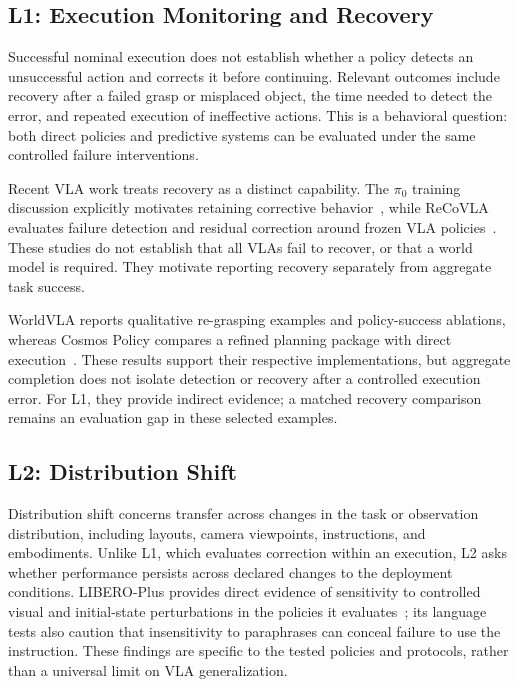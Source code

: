 \documentclass{ieeeaccess}
\begin{document}
\subsection{L1: Execution Monitoring and Recovery}
\label{sec:l1}
\textcolor[RGB]{104,48,148}{Successful nominal execution does not establish whether a policy detects an unsuccessful action and corrects it before continuing. Relevant outcomes include recovery after a failed grasp or misplaced object, the time needed to detect the error, and repeated execution of ineffective actions. This is a behavioral question: both direct policies and predictive systems can be evaluated under the same controlled failure interventions.}

\textcolor[RGB]{104,48,148}{Recent VLA work treats recovery as a distinct capability. The $\pi_0$ training discussion explicitly motivates retaining corrective behavior~\cite{pi0}, while ReCoVLA evaluates failure detection and residual correction around frozen VLA policies~\cite{recovla}. These studies do not establish that all VLAs fail to recover, or that a world model is required. They motivate reporting recovery separately from aggregate task success.}

\textcolor[RGB]{104,48,148}{WorldVLA reports qualitative re-grasping examples and policy-success ablations, whereas Cosmos Policy compares a refined planning package with direct execution~\cite{worldvla,cosmospolicy}. These results support their respective implementations, but aggregate completion does not isolate detection or recovery after a controlled execution error. For L1, they provide indirect evidence; a matched recovery comparison remains an evaluation gap in these selected examples.}

\subsection{L2: Distribution Shift}
\label{sec:l2}
\textcolor[RGB]{104,48,148}{Distribution shift concerns transfer across changes in the task or observation distribution, including layouts, camera viewpoints, instructions, and embodiments. Unlike L1, which evaluates correction within an execution, L2 asks whether performance persists across declared changes to the deployment conditions. LIBERO-Plus provides direct evidence of sensitivity to controlled visual and initial-state perturbations in the policies it evaluates~\cite{liberoplus}; its language tests also caution that insensitivity to paraphrases can conceal failure to use the instruction. These findings are specific to the tested policies and protocols, rather than a universal limit on VLA generalization.}
\end{document}
